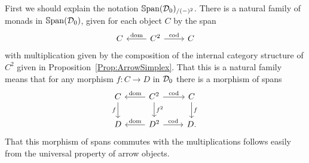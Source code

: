 First we should explain the notation $\mathbb{S}\mathrm{pan}(\mathcal{D}_0)_{/(-)^2}$. There is a natural family of monads in $\mathbb{S}\mathrm{pan}(\mathcal{D}_0)$, given for each object $C$ by the span
\[
\begin{tikzcd}
	C & C^2 \lar[swap]{\dom} \rar{\cod} & C
\end{tikzcd}
\]
with multiplication given by the composition of the internal category structure of $C^2$ given in Proposition~\ref{Prop:ArrowSimplex}. That this is a natural family means that for any morphism $f\colon C\to D$ in $\mathcal{D}_0$ there is a morphism of spans
\[
\begin{tikzcd}
	C \dar[swap]{f} & C^2 \lar[swap]{\dom} \rar{\cod} \dar{f^2} & C \dar{f} \\
	D & D^2 \lar[swap]{\dom} \rar{\cod} & D.
\end{tikzcd}
\]
That this morphism of spans commutes with the multiplications follows easily from the universal property of arrow objects.

